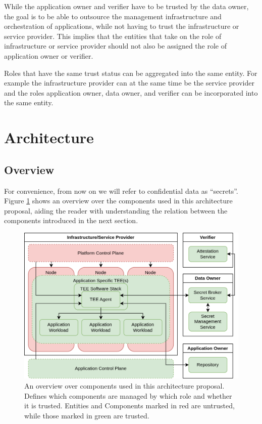 While the application owner and verifier have to be trusted by the data owner,
the goal is to be able to outsource the management infrastructure and
orchestration of applications, while not having to trust the infrastructure or
service provider. This implies that the entities that take on the role of
infrastructure or service provider should not also be assigned the role of
application owner or verifier.

Roles that have the same trust status can be aggregated into the same entity.
For example the infrastructure provider can at the same time be the service
provider and the roles application owner, data owner, and verifier can be
incorporated into the same entity.

\section{Architecture}
\label{sec:proposal:architecture}

\subsection{Overview}

For convenience, from now on we will refer to confidential data as ``secrets''.
Figure \ref{fig:proposal:architecture-overview} shows an overview over the
components used in this architecture proposal, aiding the reader with
understanding the relation between the components introduced in the next
section.

\begin{figure}[h!]
  \centering
  \includegraphics[width=\linewidth]{resources/architecture-overview.png}
  \caption[A simplified overview over the Confidential Containers architecture]{
    An overview over components used in this architecture proposal. Defines
    which components are managed by which role and whether it is trusted.
    Entities and Components marked in red are untrusted, while those marked in
    green are trusted.}
  \label{fig:proposal:architecture-overview}
\end{figure}

